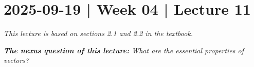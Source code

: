 \documentclass[10pt]{article}
\theoremstyle{definition}
\begin{document}

\newpage
\section{2025-09-19 | Week 04 | Lecture 11}

\textit{This lecture is based on sections 2.1 and 2.2 in the textbook.}
\begin{center}
  \begin{tcolorbox}[width=0.9\textwidth, colback=white, colframe=black]
    \textit{\textbf{The nexus question of this lecture:} What are the
      essential properties of vectors?}
  \end{tcolorbox}
\end{center}
\end{document}
